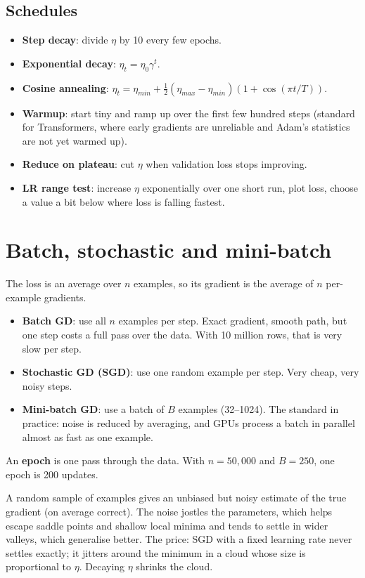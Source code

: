 \subsection{Schedules}
\begin{itemize}
\item \textbf{Step decay}: divide $\eta$ by 10 every few epochs.
\item \textbf{Exponential decay}: $\eta_t = \eta_0\gamma^t$.
\item \textbf{Cosine annealing}: $\eta_t = \eta_{min} + \frac12(\eta_{max} - \eta_{min})(1 + \cos(\pi t/T))$.
\item \textbf{Warmup}: start tiny and ramp up over the first few hundred steps (standard for Transformers, where early
  gradients are unreliable and Adam's statistics are not yet warmed up).
\item \textbf{Reduce on plateau}: cut $\eta$ when validation loss stops improving.
\item \textbf{LR range test}: increase $\eta$ exponentially over one short run, plot loss, choose a value a bit below where
  loss is falling fastest.
\end{itemize}

\section{Batch, stochastic and mini-batch}
The loss is an average over $n$ examples, so its gradient is the average of $n$ per-example gradients.
\begin{itemize}
\item \textbf{Batch GD}: use all $n$ examples per step. Exact gradient, smooth path, but one step costs a full pass over
  the data. With 10 million rows, that is very slow per step.
\item \textbf{Stochastic GD (SGD)}: use one random example per step. Very cheap, very noisy steps.
\item \textbf{Mini-batch GD}: use a batch of $B$ examples (32--1024). The standard in practice: noise is reduced by
  averaging, and GPUs process a batch in parallel almost as fast as one example.
\end{itemize}
An \textbf{epoch} is one pass through the data. With $n = 50{,}000$ and $B = 250$, one epoch is 200 updates.

\begin{intuition}
A random sample of examples gives an unbiased but noisy estimate of the true gradient (on average correct). The noise
jostles the parameters, which helps escape saddle points and shallow local minima and tends to settle in wider valleys,
which generalise better. The price: SGD with a fixed learning rate never settles exactly; it jitters around the minimum
in a cloud whose size is proportional to $\eta$. Decaying $\eta$ shrinks the cloud.
\end{intuition}

